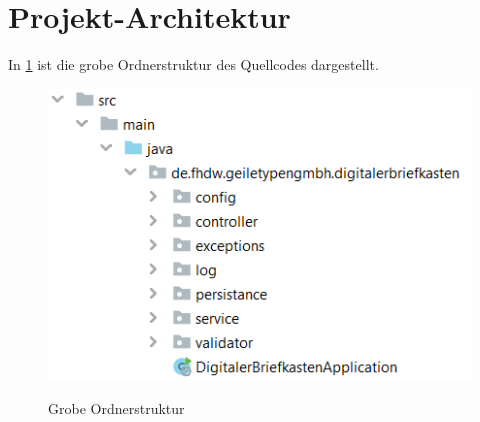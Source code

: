 

\section{Projekt-Architektur}

In \cref{fig:root-ordner} ist die grobe Ordnerstruktur des Quellcodes dargestellt.

\begin{figure}[hbt]
    \centering
    \begin{minipage}[t]{1\textwidth}
        \caption{Grobe Ordnerstruktur}
        \includegraphics[width=1\textwidth]{img/Projekt-root-ordner.png}\\
        \label{fig:root-ordner}
    \end{minipage}
\end{figure}

